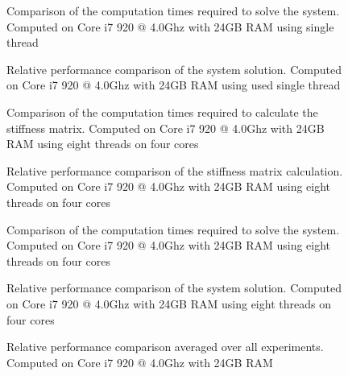 \begin{figure}[h]
\centerline{}
\caption{Comparison of the computation times required to solve the system. Computed on Core i7 920 @ 4.0Ghz with 24GB RAM using single thread}
\label{fig:singleSystemi7CT}
\end{figure}

\begin{figure}[h]
\centerline{}
\caption{Relative performance comparison of the system solution. Computed on Core i7 920 @ 4.0Ghz with 24GB RAM using used single thread}
\label{fig:singleSystemi7}
\end{figure}

\begin{figure}[h]
\centerline{}
\caption{Comparison of the computation times required to calculate the stiffness matrix. Computed on Core i7 920 @ 4.0Ghz with 24GB RAM using eight threads on four cores}
\label{fig:multiStiffi7CT}
\end{figure}

\begin{figure}[h]
\centerline{}
\caption{Relative performance comparison of the stiffness matrix calculation. Computed on Core i7 920 @ 4.0Ghz with 24GB RAM using eight threads on four cores}
\label{fig:multiStiffi7}
\end{figure}

\begin{figure}[h]
\centerline{}
\caption{Comparison of the computation times required to solve the system. Computed on Core i7 920 @ 4.0Ghz with 24GB RAM using eight threads on four cores}
\label{fig:multiSystemi7CT}
\end{figure}

\begin{figure}[h]
\centerline{}
\caption{Relative performance comparison of the system solution. Computed on Core i7 920 @ 4.0Ghz with 24GB RAM using eight threads on four cores}
\label{fig:multiSystemi7}
\end{figure}

\begin{figure}[h]
\centerline{}
\caption{Relative performance comparison averaged over all experiments. Computed on Core i7 920 @ 4.0Ghz with 24GB RAM}
\label{fig:averagei7}
\end{figure}

